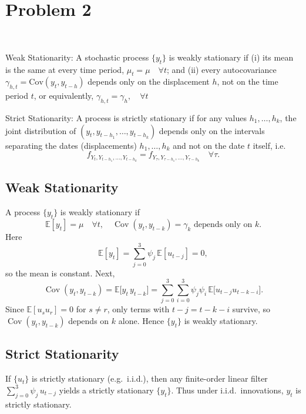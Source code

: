 \documentclass[a4paper,12pt]{article} %
\theoremstyle{nonitalic}
\newenvironment{solution}[1]
  {\renewcommand\theinnercustomsol{#1}%
   \innercustomsol}
  {\endinnercustomsol}
\newcounter{solutionctr}[section]
\renewcommand{\thesolutionctr}{(\alph{solutionctr})}
\newenvironment{autosolution}
  {\refstepcounter{solutionctr}%
   \begin{solution}{\thesolutionctr}}
  {\end{solution}}
\begin{document}
\section{Problem 2}

\begin{autosolution}
    \

    Weak Stationarity: A stochastic process $\{y_{t}\}$ is weakly stationary if (i) its mean is the same at every time period, $\mu_{t}=\mu\quad\forall t$; and (ii) every autocovariance $\gamma_{h,t}=\mathrm{Cov}(y_{t},y_{t-h})$ depends only on the displacement $h$, not on the time period $t$, or equivalently, $\gamma_{h,t}=\gamma_{h},\quad\forall t$
    
    Strict Stationarity: A process is strictly stationary if for any values $h_{1},\ldots,h_{k}$, the joint distribution of $(y_{t},y_{t-h_{1}},\ldots,y_{t-h_{k}})$ depends only on the intervals separating the dates (displacements) $h_{1},\ldots,h_{k}$ and not on the date $t$ itself, i.e.
$$f_{Y_{t},Y_{t-h_{1}},\ldots,Y_{t-h_{k}}} = f_{Y_{\tau},Y_{\tau-h_{1}},\ldots,Y_{\tau-h_{k}}}\quad\forall\tau.$$
    \subsection*{Weak Stationarity}

    A process $\{y_t\}$ is weakly stationary if
    \[
    \mathbb{E}[y_t]=\mu\quad \forall t,
    \quad 
    \operatorname{Cov}(y_t,y_{t-k})=\gamma_k \text{ depends only on }k.
    \]
    Here
    \[
    \mathbb{E}[y_t]
    =\sum_{j=0}^3\psi_j\,\mathbb{E}[u_{t-j}]
    =0,
    \]
    so the mean is constant.  Next,
    \[
    \operatorname{Cov}(y_t,y_{t-k})
    =\mathbb{E}\bigl[y_t\,y_{t-k}\bigr]
    =\sum_{j=0}^3\sum_{i=0}^3\psi_j\psi_i\,
    \mathbb{E}\bigl[u_{t-j}u_{t-k-i}\bigr].
    \]
    Since $\mathbb{E}[u_su_r]=0$ for $s\neq r$, only terms with
    $t-j = t-k-i$ survive, so $\operatorname{Cov}(y_t,y_{t-k})$ depends on $k$ alone.  
    Hence $\{y_t\}$ is weakly stationary.

    \subsection*{Strict Stationarity}

    If $\{u_t\}$ is strictly stationary (e.g.\ i.i.d.), then any finite-order linear filter
    $\sum_{j=0}^3\psi_j\,u_{t-j}$
    yields a strictly stationary $\{y_t\}$.  Thus under i.i.d.\ innovations, $y_t$ is strictly stationary.
\end{autosolution}
\end{document}
